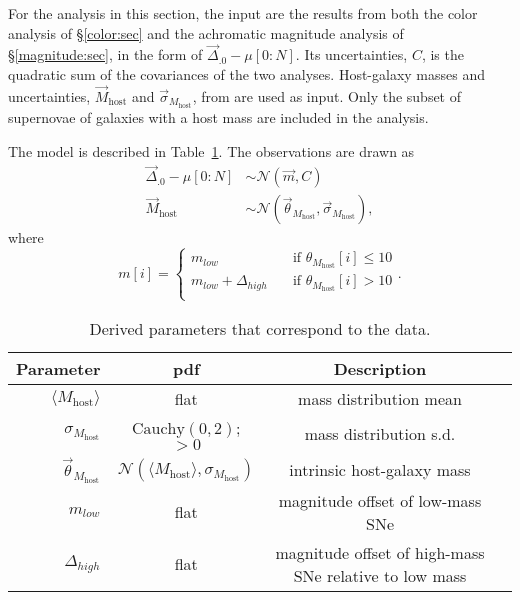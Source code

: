 \documentclass{aastex61}   	%
\begin{document}
For the analysis in this section, the input are the results from both the color analysis of \S\ref{color:sec} and the achromatic magnitude analysis of 
\S\ref{magnitude:sec}, in the form of $\vec{\Delta}_{.0} - \mu[0:N]$.  Its
uncertainties, $C$, is the quadratic sum of the covariances of the two analyses.  Host-galaxy masses and uncertainties, $\vec{M}_{\text{host}}$  and
$\vec{\sigma}_{M_{\text{host}}}$,
from \citet{2013ApJ...770..108C} are used as input.  Only the subset of supernovae of galaxies with a host mass are included in the analysis.

The model is described in Table~\ref{mass:tab}.
The observations are drawn as
\begin{align}
\vec{\Delta}_{.0} - \mu[0:N] &  \sim \mathcal{N}(\vec{m},C) \\
\vec{M}_{\text{host}} & \sim \mathcal{N}(\vec{\theta}_{M_{\text{host}}},\vec{\sigma}_{M_{\text{host}}}),
\end{align}
where
\begin{equation}
m[i]=\begin{cases}
m_{low} & \quad \text{if } \theta_{M_{\text{host}}}[i] \le10 \\
m_{low}+\Delta_{high}& \quad \text{if } \theta_{M_{\text{host}}}[i] > 10 \\
\end{cases}.
\end{equation}

\begin{table}
\begin{center}
\caption{Derived parameters that correspond to the data.\label{mass:tab}}
\begin{tabular}{rccc}
\hline
Parameter & pdf & Description\\ \hline
$\langle M_{\text{host}} \rangle$ &flat& mass distribution mean \\
$\sigma_{M_{\text{host}}}$ &$\text{Cauchy}(0,2)$; $>0$& mass distribution s.d. \\
$\vec{\theta}_{M_{\text{host}}}$ &$\mathcal{N}(\langle M_{\text{host}} \rangle,\sigma_{M_{\text{host}}})$ &intrinsic host-galaxy mass\\
$m_{low}$ & flat & magnitude offset of low-mass SNe\\
$\Delta_{high}$ & flat & magnitude offset of high-mass SNe relative to low mass\\
\hline
\end{tabular}
\end{center}
\end{table}
\end{document}
